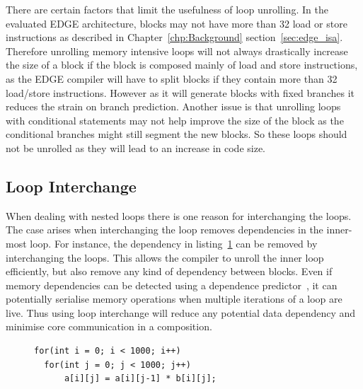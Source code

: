 There are certain factors that limit the usefulness of loop unrolling.
In the evaluated EDGE architecture, blocks may not have more than 32 load or store instructions as described in Chapter~\ref{chp:Background} section~\ref{sec:edge_isa}.
Therefore unrolling memory intensive loops will not always drastically increase the size of a block if the block is composed mainly of load and store instructions, as the EDGE compiler will have to split blocks if they contain more than 32 load/store instructions.
However as it will generate blocks with fixed branches it reduces the strain on branch prediction.
Another issue is that unrolling loops with conditional statements may not help improve the size of the block as the conditional branches might still segment the new blocks.
So these loops should not be unrolled as they will lead to an increase in code size.


\subsection{Loop Interchange}
When dealing with nested loops there is one reason for interchanging the loops.
The case arises when interchanging the loop removes dependencies in the inner-most loop.
For instance, the dependency in listing~\ref{lst:dep} can be removed by interchanging the loops. 
This allows the compiler to unroll the inner loop efficiently, but also remove any kind of dependency between blocks.
Even if memory dependencies can be detected using a dependence predictor~\cite{chrysos1998storesets}, it can potentially serialise memory operations when multiple iterations of a loop are live.
Thus using loop interchange will reduce any potential data dependency and minimise core communication in a composition.


\begin{figure}[t]
\lstset{language=C,numbersep=4pt}
\begin{center}
\begin{lstlisting}
for(int i = 0; i < 1000; i++)
  for(int j = 0; j < 1000; j++)
      a[i][j] = a[i][j-1] * b[i][j];
\end{lstlisting}
\end{center}
\vspace{-1em}
\label{lst:dep}
\vspace{1em}
\end{figure}

